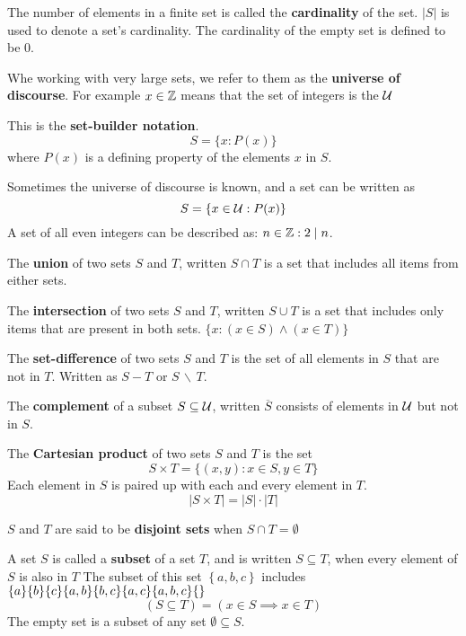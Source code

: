 \documentclass[english, 12pt]{article}
\begin{document}
\begin{defn}
The number of elements in a finite set is called the \textbf{cardinality} of the set. $ |S|$ is used to denote a set's cardinality. The cardinality of the empty set is defined to be 0.
\end{defn}
\begin{defn}
Whe working with very large sets, we refer to them as the \textbf{universe of discourse}. For example $x \in {\mathbb{Z}}$ means that the set of integers is the ${\mathcal{U}}$
\end{defn}
\begin{exmp}
This is the \textbf{set-builder notation}.
\[S = \{ x : P(x)\} \]
where $P(x)$ is a defining property of the elements $x$ in $S$.
\end{exmp}
\begin{exmp}
Sometimes the universe of discourse is known, and a set can be written as 
\[S = \{ x \in {\mathcal{U}}: P(x)\} \]
A set of all even integers can be described as: $ n \in {\mathbb{Z}} : 2 \mid n$.
\end{exmp}
\begin{defn}
The \textbf{union} of two sets $S$ and $T$, written $S \cap T$ is a set that includes all items from either sets.
\end{defn}
\begin{defn}
The \textbf{intersection} of two sets $S$ and $T$, written $S \cup T$ is a set that includes only items that are present in both sets. $\{x : (x \in S) \land (x \in T)\}$
\end{defn}
\begin{defn}
The \textbf{set-difference} of two sets $S$ and $T$ is the set of all elements in $S$ that are not in $T$. Written as $S - T$ or $S\,\backslash\, T$.
\end{defn}
\begin{defn}
The \textbf{complement} of a subset $S \subseteq {\mathcal{U}}$, written $\overline{S}$ consists of elements in ${\mathcal{U}}$ but not in $S$.
\end{defn}
\begin{defn}
The \textbf{Cartesian product} of two sets $S$ and $T$ is the set 
\[S \times T = \{(x,y) : x \in S, y \in T \} \]
Each element in $S$ is paired up with each and every element in $T$.
\[ |S \times T| = |S|\cdot |T| \]
\end{defn}
\begin{defn}
$S$ and $T$ are said to be \textbf{disjoint sets} when $S \cap T = \emptyset$
\end{defn}

\begin{defn}
A set $S$ is called a \textbf{subset} of a set $T$, and is written $S \subseteq T$, when every element of $S$ is also in $T$
The subset of this set $\left\{ {a,b,c}\right\}$ includes
$\foreach \n in {a,b,c,{a,b},{b,c},{a,c},{a,b,c},{}}{\lbrace \n \rbrace}$
\[(S \subseteq T) = (x \in S \implies x \in T)\]
The empty set is a subset of any set $\emptyset \subseteq S$.
\end{defn}
\end{document}
